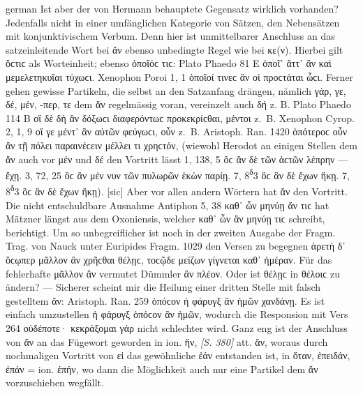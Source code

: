 \begin{otherlanguage*}{german}
Ist aber der von Hermann behauptete Gegensatz wirklich vorhanden? Jedenfalls nicht in einer umfänglichen Kategorie von Sätzen, den Nebensätzen mit konjunktivischem Verbum. Denn hier ist unmittelbarer Anschluss an das satzeinleitende Wort bei ἄν ebenso unbedingte Regel wie bei κε(ν). Hierbei gilt ὅϲτιϲ als Worteinheit; ebenso ὁποῖόϲ τιϲ: Plato Phaedo 81 Ε ὁποῖ᾽ ἄττ᾽ ἂν καὶ μεμελετηκυῖαι τύχωϲι. Xenophon Poroi 1, 1 ὁποῖοί τινεϲ ἂν οἱ προϲτάται ὦϲι. Ferner gehen gewisse Partikeln, die selbst an den Satzanfang drängen, nämlich γάρ, γε, δέ, μέν, -περ, τε dem ἄν regelmässig voran, vereinzelt auch δή z. B. Plato Phaedo 114 B οἳ δὲ δὴ ἂν δόξωϲι διαφερόντωϲ προκεκρίϲθαι, μέντοι z.~Β. Xenophon Cyrop. 2, 1, 9 οἵ γε μέντ᾽ ἂν αὐτῶν φεύγωϲι, οὖν z.~Β. Aristoph. Ran. 1420 ὁπότεροϲ οὖν ἂν τῇ πόλει παραινέϲειν μέλλει τι χρηϲτόν, (wiewohl Herodot an einigen Stellen dem ἄν auch vor μέν und δέ den Vortritt lässt 1, 138, 5 ὃϲ ἂν δὲ τῶν ἀϲτῶν λέπρην — ἔχῃ. 3, 72, 25 ὃϲ ἂν μέν νυν τῶν πυλωρῶν ἑκὼν παρίῃ. 7, 8\textsuperscript{δ}3 ὃϲ ἂν δὲ ἔχων ἥκῃ. 7, 8\textsuperscript{δ}3 ὃϲ ἂν δὲ ἔχων ἥκῃ). [sic] Aber vor allen andern Wörtern hat ἄν den Vortritt. Die nicht entschuldbare Ausnahme Antiphon 5, 38 καθ᾽ ὧν μηνύῃ ἄν τιϲ hat Mätzner längst aus dem Oxoniensis, welcher καθ᾽ ὧν ἂν μηνύῃ τιϲ schreibt, berichtigt. Um so unbegreiflicher ist noch in der zweiten Ausgabe der Fragm. Trag. von Nauck unter Euripides Fragm. 1029 den Versen zu begegnen ἀρετὴ δ᾽ ὅϲῳπερ μᾶλλον ἂν χρῆϲθαι θέλῃϲ, τοϲῷδε μείζων γίγνεται καθ᾽ ἡμέραν. Für das fehlerhafte μᾶλλον ἂν vermutet Dümmler ἂν πλέον. Oder ist θέλῃϲ in θέλοιϲ zu ändern? — Sicherer scheint mir die Heilung einer dritten Stelle mit falsch gestelltem ἄν: Aristoph. Ran. 259 ὁπόϲον ἡ φάρυγξ ἂν ἡμῶν χανδάνῃ. Es ist einfach umzustellen ἡ φάρυγξ ὁπόϲον ἂν ἡμῶν, wodurch die Responsion mit Vers 264 οὐδέποτε· κεκράξομαι γάρ nicht schlechter wird. Ganz eng ist der Anschluss von ἄν an das Fügewort geworden in ion. ἤν, \hypertarget{p380}{\emph{[S. 380]}}\label{p380} att. ἄν, woraus durch nochmaligen Vortritt von εἰ das gewöhnliche ἐάν entstanden ist, in ὅταν, ἐπειδάν, ἐπάν = ion. ἐπήν, wo dann die Möglichkeit auch nur eine Partikel dem ἄν vorzuschieben wegfällt.


\end{otherlanguage*}
